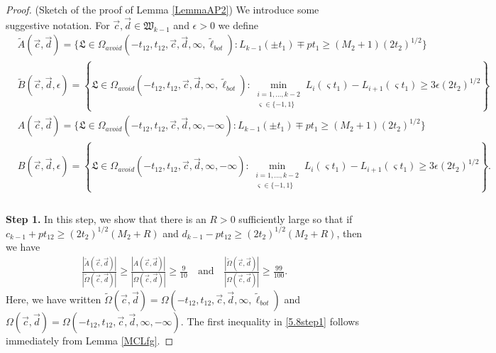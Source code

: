 \begin{proof}(Sketch of the proof of Lemma \ref{LemmaAP2}) We introduce some suggestive notation. For $\vec{c}, \vec{d} \in \mathfrak{W}_{k-1}$ and $\epsilon > 0$ we define
	\begin{equation}
	\begin{split}
	&\tilde A(\vec{c}, \vec{d}) = \{\mathfrak{L} \in \Omega_{avoid}(-t_{12}, t_{12}, \vec{c}, \vec{d}, \infty, \tilde{\ell}_{bot}): L_{k-1}(\pm t_{1}) \mp pt_1 \geq (M_2 + 1) (2t_2)^{1/2} \} \\
	&\tilde B(\vec{c}, \vec{d}, \epsilon) = \left\{ \mathfrak{L} \in \Omega_{avoid}(-t_{12}, t_{12}, \vec{c}, \vec{d}, \infty, \tilde{\ell}_{bot}): \min_{\substack {i = 1, \dots, k-2 \\ \varsigma \in \{-1, 1\}} } L_{i}(\varsigma t_1) - L_{i+1}(\varsigma t_1) \geq 3\epsilon (2t_2)^{1/2} \right\} \\
	&A(\vec{c}, \vec{d}) = \{ \mathfrak{L} \in \Omega_{avoid}(-t_{12}, t_{12}, \vec{c}, \vec{d}, \infty, -\infty): L_{k-1}(\pm t_{1}) \mp pt_1 \geq (M_2 + 1) (2t_2)^{1/2} \} \\
	&B(\vec{c}, \vec{d}, \epsilon) = \left\{ \mathfrak{L} \in \Omega_{avoid}(-t_{12}, t_{12}, \vec{c}, \vec{d}, \infty, -\infty): \min_{\substack {i = 1, \dots, k-2 \\ \varsigma \in \{-1, 1\}} } L_{i}(\varsigma t_1) - L_{i+1}(\varsigma t_1) \geq 3\epsilon (2t_2)^{1/2} \right\}. \\
	\end{split}
	\end{equation} \\
	
	{\bf \raggedleft Step 1.} In this step, we show that there is an $R > 0$ sufficiently large so that if $c_{k-1} + pt_{12} \geq (2t_2)^{1/2} (M_2 + R)$ and $d_{k-1} - pt_{12} \geq (2t_2)^{1/2} (M_2 + R)$, then we have 
	\begin{equation}\label{5.8step1}
	\begin{split}
	\frac{|\tilde A(\vec{c}, \vec{d})|}{|\tilde{\Omega}(\vec{c}, \vec{d})|} \geq \frac{| A(\vec{c}, \vec{d})|}{|{\Omega}(\vec{c}, \vec{d})|} \geq  \frac{9}{10} \quad \mathrm{and} \quad \frac{|\tilde{\Omega}(\vec{c}, \vec{d})|}{|{\Omega}(\vec{c}, \vec{d})|} \geq \frac{99}{100}.
	\end{split}
	\end{equation} 
	Here, we have written $\tilde{\Omega}(\vec{c}, \vec{d})  = {\Omega}(-t_{12}, t_{12}, \vec{c}, \vec{d}, \infty, \tilde{\ell}_{bot})$ and $\Omega(\vec{c}, \vec{d}) = {\Omega}(-t_{12}, t_{12}, \vec{c}, \vec{d}, \infty, -\infty)$. The first inequality in \eqref{5.8step1} follows immediately from Lemma \ref{MCLfg}. 
	

\end{proof}
